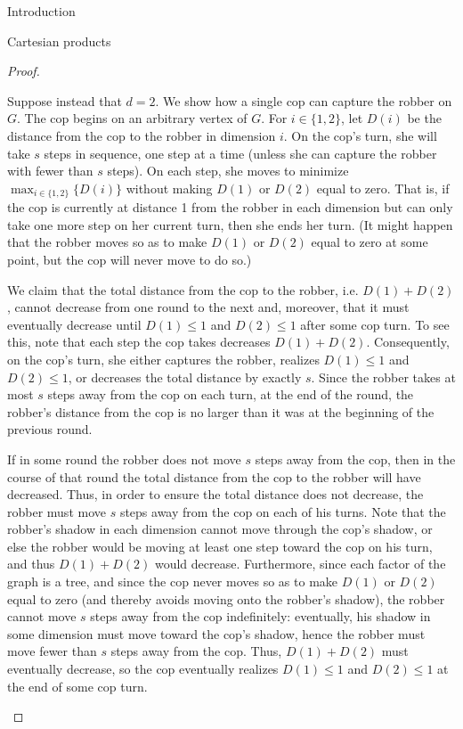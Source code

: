 \documentclass[12pt]{amsart}
\theoremstyle{definition}
\begin{document}
\begin{section}{Introduction}
\begin{section}{Cartesian products}
\begin{proof}
\begin{enumerate}[label={\textbf{(\alph*)}}]
    Suppose instead that $d=2$.  We show how a single cop can capture the robber on $G$.  The cop begins on an arbitrary vertex of $G$.  For $i\in\{1,2\}$, let $D(i)$ be the distance from the cop to the robber in dimension $i$.  On the cop's turn, she will take $s$ steps in sequence, one step at a time (unless she can capture the robber with fewer than $s$ steps).  On each step, she moves to minimize $\displaystyle\max_{i\in\{1,2\}}\{D(i)\}$ without making $D(1)$ or $D(2)$ equal to zero.  That is, if the cop is currently at distance 1 from the robber in each dimension but can only take one more step on her current turn, then she ends her turn.  (It might happen that the robber moves so as to make $D(1)$ or $D(2)$ equal to zero at some point, but the cop will never move to do so.)
    
    We claim that the total distance from the cop to the robber, i.e. $D(1)+D(2)$, cannot decrease from one round to the next and, moreover, that it must eventually decrease until $D(1) \le 1$ and $D(2) \le 1$ after some cop turn.  To see this, note that each step the cop takes decreases $D(1)+D(2)$.  Consequently, on the cop's turn, she either captures the robber, realizes $D(1) \le 1$ and $D(2) \le 1$, or decreases the total distance by exactly $s$.  Since the robber takes at most $s$ steps away from the cop on each turn, at the end of the round, the robber's distance from the cop is no larger than it was at the beginning of the previous round.  
    
    If in some round the robber does not move $s$ steps away from the cop, then in the course of that round the total distance from the cop to the robber will have decreased.  Thus, in order to ensure the total distance does not decrease, the robber must move $s$ steps away from the cop on each of his turns.  Note that the robber's shadow in each dimension cannot move through the cop's shadow, or else the robber would be moving at least one step toward the cop on his turn, and thus $D(1)+D(2)$ would decrease.  Furthermore, since each factor of the graph is a tree, and since the cop never moves so as to make $D(1)$ or $D(2)$ equal to zero (and thereby avoids moving onto the robber's shadow), the robber cannot move $s$ steps away from the cop indefinitely: eventually, his shadow in some dimension must move toward the cop's shadow, hence the robber must move fewer than $s$ steps away from the cop.  Thus, $D(1)+D(2)$ must eventually decrease, so the cop eventually realizes $D(1) \le 1$ and $D(2)\le 1$ at the end of some cop turn.


\end{enumerate}
\end{proof}
\end{section}
\end{section}
\end{document}
